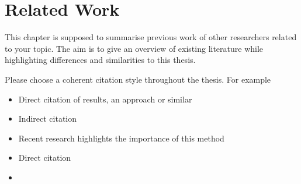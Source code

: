 \chapter{Related Work}
\label{ch:RW}

This chapter is supposed to summarise previous work of other researchers related to your topic.
The aim is to give an overview of existing literature while highlighting differences and similarities to this thesis.

Please choose a coherent citation style throughout the thesis. For example

\begin{itemize}
	\item Direct citation of results, an approach or similar
	\item Indirect citation
	\item[] Recent research highlights the importance of this method %
	\item Direct citation
	\item[]  %
\end{itemize}



